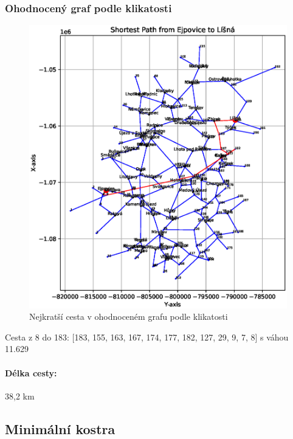 \subsubsection*{Ohodnocený graf podle klikatosti}
\begin{figure}[H]
    \centering
    \includegraphics[width=\textwidth]{images/Ejpovice_curvature.eps}
    \caption{Nejkratší cesta v ohodnoceném grafu podle klikatosti}
\end{figure}
Cesta z 8 do 183: [183, 155, 163, 167, 174, 177, 182, 127, 29, 9, 7, 8] s váhou 11.629
\paragraph{Délka cesty:} 38,2 km

\subsection{Minimální kostra}


